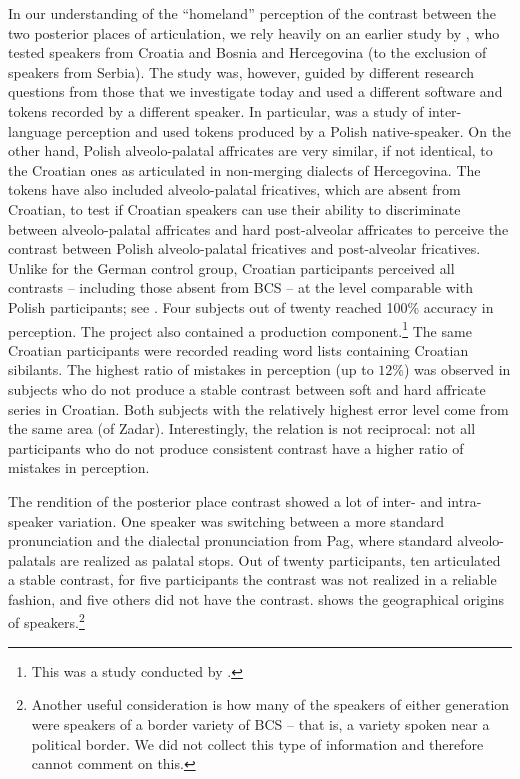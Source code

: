 \documentclass[output=paper,modfonts,newtxmath,hidelinks,]{langscibook}
\begin{document}
In our understanding of the “homeland” perception of the contrast between the two posterior places of articulation, we rely heavily on an earlier study by \citet{Cavar-Hamann2011}, who test{ed} speakers from Croatia and Bosnia and Hercegovina (to the exclusion of speakers from Serbia). The study was, however, guided by different research questions from those that we investigate today and used a different software and tokens recorded by a different speaker. In particular, \citet{Cavar-Hamann2011} was a study of inter-language perception and used tokens produced by a Polish native-speaker. On the other hand, Polish alveolo-palatal affricates are very similar, if not identical, to the Croatian ones as articulated in non-merging dialects of Hercegovina. The tokens have also included alveolo-palatal fricatives, which are absent from Croatian, to test if Croatian speakers can use their ability to discriminate between alveolo-palatal affricates and hard post-alveolar affricates to perceive the contrast between Polish alveolo-palatal fricatives and post-alveolar fricatives. Unlike for the German control group, Croatian participants perceived all contrasts – including those absent from BCS – at the level comparable with Polish participants; see . Four subjects out of twenty reached 100\% accuracy in perception. The project also contained a production component.\footnote{This was a study conducted by \citet{Cavar-Hamann2008}.} The same Croatian participants were recorded reading word lists containing Croatian sibilants. The highest ratio of mistakes in perception (up to $12\%$) was observed in subjects who do not produce a stable contrast between soft and hard affricate series in Croatian. Both subjects with the relatively highest error level come from the same area (of Zadar). Interestingly, the relation is not reciprocal: not all participants who do not produce consistent contrast have a higher ratio of mistakes in perception.

The rendition of the posterior place contrast showed a lot of inter- and intra-speaker variation. One speaker was switching between a more standard pronunciation and the dialectal pronunciation from Pag, where standard alveolo-palatals are realized as palatal stops. Out of twenty participants, ten articulated a stable contrast, for five participants the contrast was not realized in a reliable fashion, and five others did not have the contrast.  shows the geographical origins of speakers.\footnote{Another useful consideration is how many of the speakers of either generation were speakers of a border variety of BCS – that is, a variety spoken near a political border. We did not collect this type of information and therefore cannot comment on this.}
\end{document}
